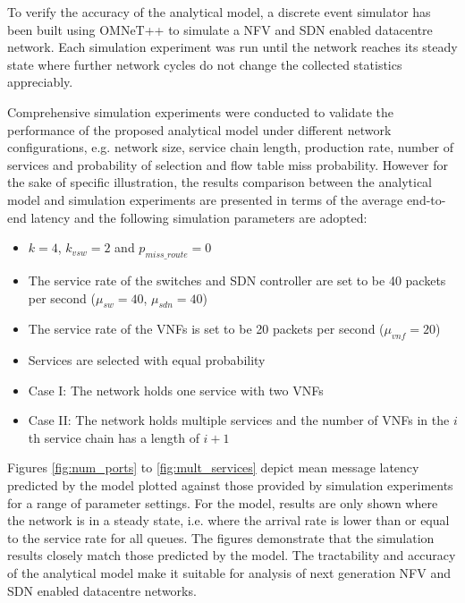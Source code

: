 To verify the accuracy of the analytical model, a discrete event simulator has been built using OMNeT++ \cite{VargaH08} to simulate a NFV and SDN enabled datacentre network. Each simulation experiment was run until the network reaches its steady state where further network cycles do not change the collected statistics appreciably.

Comprehensive simulation experiments were conducted to validate the performance of the proposed analytical model under different network configurations, e.g. network size, service chain length, production rate, number of services and probability of selection and flow table miss probability. However for the sake of specific illustration, the results comparison between the analytical model and simulation experiments are presented in terms of the average end-to-end latency and the following simulation parameters are adopted:

\begin{itemize}
\item $k = 4$, $k_{vsw} = 2$ and $p_{miss\_route} = 0$
\item The service rate of the switches and SDN controller are set to be 40 packets per second ($\mu_{sw} = 40$, $\mu_{sdn} = 40$)
\item The service rate of the VNFs is set to be 20 packets per second ($\mu_{vnf} = 20$)
\item Services are selected with equal probability
\item Case I: The network holds one service with two VNFs
\item Case II: The network holds multiple services and the number of VNFs in the $i$th service chain has a length of $i+1$
\end{itemize}

Figures \ref{fig:num_ports} to \ref{fig:mult_services} depict mean message latency predicted by the model plotted against those provided by simulation experiments for a range of parameter settings. For the model, results are only shown where the network is in a steady state, i.e. where the arrival rate is lower than or equal to the service rate for all queues. The figures demonstrate that the simulation results closely match those predicted by the model. The tractability and accuracy of the analytical model make it suitable for analysis of next generation NFV and SDN enabled datacentre networks.